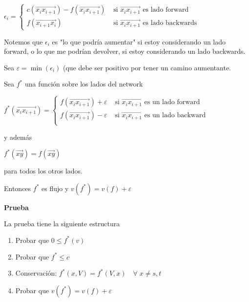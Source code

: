 \documentclass[10pt,a4paper]{article}
\begin{document}
\begin{center}
$\epsilon_i = \begin{cases} c(\overrightarrow{x_ix_{i+1}}) - f(\overrightarrow{x_ix_{i+1}}) & \text{ si } \overrightarrow{x_ix_{i+1}} \text{ es lado forward}\\ f(\overrightarrow{x_{i+1}x_i}) &\text{ si } \overrightarrow{x_ix_{i+1}} \text{ es lado backwards} \end{cases}$
\end{center}

Notemos que $\epsilon_i$ es "lo que podría aumentar" si estoy considerando un lado forward, o lo que me podrían devolver, si estoy considerando un lado backwards.

Sea $\varepsilon = \min(\epsilon_i)$ (que debe ser positivo por tener un camino aumentante.

Sea $f^*$ una función sobre los lados del network

\begin{center}
$f^*(\overrightarrow{x_ix_{i+1}}) = \begin{cases} f(\overrightarrow{x_ix_{i+1}}) + \varepsilon & \text{ si }\overrightarrow{x_ix_{i+1}} \text{ es un lado forward}\\ f(\overrightarrow{x_ix_{i+1}}) - \varepsilon & \text{ si }\overrightarrow{x_ix_{i+1}} \text{ es un lado backward}\\ \end{cases} $
\end{center}

y además

\begin{center}
$f^*(\overrightarrow{xy}) = f(\overrightarrow{xy})$
\end{center}

para todos los otros lados.

Entonces $f^*$ es flujo y $v(f^*) = v(f)+\varepsilon$

\textbf{Prueba}

La prueba tiene la siguiente estructura

\begin{enumerate}

	\item Probar que $0 \leq f^* (v)$
	\item Probar que $f^* \leq c$
	\item Conservación: $f^*(x, V) = f^*(V, x) \quad\forall\; x\neq s, t$
	\item Probar que $v(f^*) = v(f)+\varepsilon$
\end{enumerate}
\end{document}
